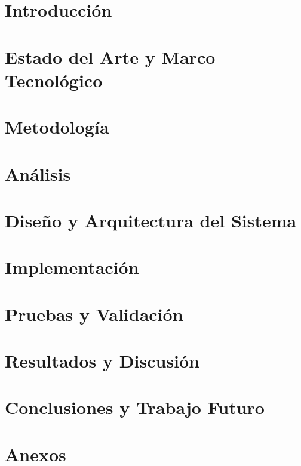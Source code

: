 \documentclass[a4paper,12pt]{report}
\begin{document}


\tableofcontents
\newpage

\chapter{Introducción}


\chapter{Estado del Arte y Marco Tecnológico}


\chapter{Metodología}


\chapter{Análisis}


\chapter{Diseño y Arquitectura del Sistema}


\chapter{Implementación}


\chapter{Pruebas y Validación}


\chapter{Resultados y Discusión}


\chapter{Conclusiones y Trabajo Futuro}


\printbibliography

\appendix
\renewcommand{\thesection}{Anexo \Alph{section}}  
\chapter*{Anexos}

\end{document}
